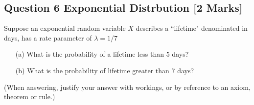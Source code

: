 


\subsection*{Question 6 Exponential Distrbution [2 Marks]}

Suppose an exponential random variable $X$ describes a ``lifetime" denominated in days, has a rate parameter of $\lambda = 1/7$
\begin{itemize}
\item[(a)]  What is the probability of a lifetime less than 5 days?
\item[(b)]  What is the probability of lifetime greater than 7 days?
\end{itemize}


\noindent(When answering, justify your answer with workings, or by reference to an
axiom, theorem or rule.)
\bigskip










